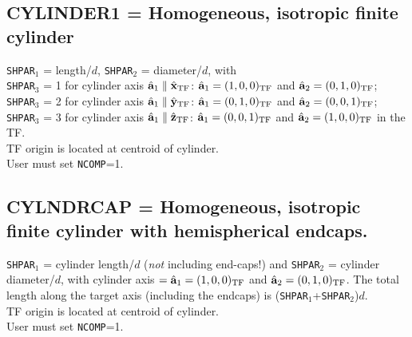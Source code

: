 \subsection{ CYLINDER1 = Homogeneous, isotropic finite cylinder
            \label{sec:CYLINDER1}}
	{\tt SHPAR$_1$} = length/$d$,
	{\tt SHPAR$_2$} = diameter/$d$, with\\
	{\tt SHPAR}$_3$ = 1 for cylinder axis 
        $\hat{\bf a}_1\parallel \hat{\bf x}_{\rm TF}$:
	$\hat{\bf a}_1=(1,0,0)_{\rm TF}$
	            and $\hat{\bf a}_2=(0,1,0)_{\rm TF}$;\\
	{\tt SHPAR}$_3$ = 2 for cylinder axis 
        $\hat{\bf a}_1\parallel \hat{\bf y}_{\rm TF}$:
        $\hat{\bf a}_1=(0,1,0)_{\rm TF}$
	            and $\hat{\bf a}_2=(0,0,1)_{\rm TF}$;\\
	{\tt SHPAR}$_3$ = 3 for cylinder axis 
        $\hat{\bf a}_1\parallel \hat{\bf z}_{\rm TF}$:
	$\hat{\bf a}_1=(0,0,1)_{\rm TF}$
	            and $\hat{\bf a}_2=(1,0,0)_{\rm TF}$ in the TF.\\
	TF origin is located at centroid of cylinder.\\
	User must set {\tt NCOMP}=1.
\subsection{ CYLNDRCAP = Homogeneous, isotropic finite cylinder with 
            hemispherical endcaps.
            \label{sec:CYLNDRCAP}}
	{\tt SHPAR$_1$} = cylinder length/$d$ 
	({\it not} including end-caps!) and
	{\tt SHPAR$_2$} = cylinder diameter/$d$,
	with cylinder axis 
	$={\hat{\bf a}}_1=(1,0,0)_{\rm TF}$
	and ${\hat{\bf a}}_2=(0,1,0)_{\rm TF}$.
	The total length along the target axis (including the endcaps) is
	({\tt SHPAR$_1$}+{\tt SHPAR$_2$})$d$. \\
	TF origin is located at centroid of cylinder.\\
	User must set {\tt NCOMP}=1.
